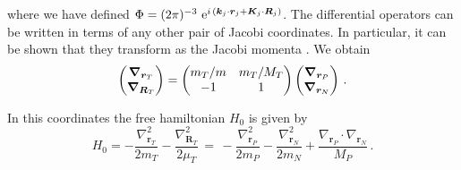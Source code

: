 where we have defined $\Phi = (2 \pi)^{-3}\ \rme^{i \,(\bm{k}_j\cdot \bm{r}_j + \bm{K}_j \cdot \bm{R}_{j})} $.
The differential operators can be written in terms of any other pair of
Jacobi coordinates. In particular, it can be shown that they transform
as the  Jacobi momenta \parencite{Fiol2002JPBp149}. We obtain
\begin{equation}\label{Q:Rel-Opp}
\left( \begin{matrix} \bm{\nabla}_{\bm{r}_{T}} \cr
\bm{\nabla}_{\bm{R}_{T}} \cr
\end{matrix}
\right) = \left(\begin{matrix}m_{T}
/ m & m_{T}/M_{T} \cr -1 & 1 \cr
\end{matrix}
\right) \left( \begin{matrix}
\bm{\nabla}_{\bm{r}_{P}} \cr
\bm{\nabla}_{\bm{r}_{N}} \cr
\end{matrix}
\right)  \, .
\end{equation}

In this coordinates the free hamiltonian $H_{0}$ is given by
\[
H_{0}=-\frac{ \nabla^{2}_{\bm{r}_{T}}}{2 m_{T}}
-\frac{\nabla^{2}_{\bm{R}_{T}}}{2 \mu_{T}} \, = \,
    -\frac{\nabla^{2}_{\bm{r}_{P}}}{2 m_{P}}
  -\frac{ \nabla^{2}_{\bm{r}_{N}}}{2 m_{N}}
  +\frac{\nabla_{\bm{r}_{P}} \cdot \nabla_{\bm{r}_{N}}}{M_{P}} \, .
\]

